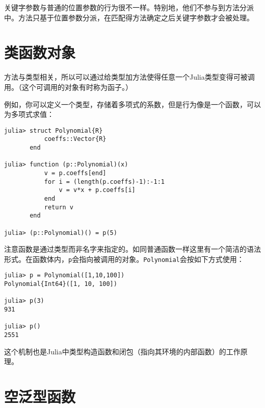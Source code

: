 关键字参数与普通的位置参数的行为很不一样。特别地，他们不参与到方法分派中。方法只基于位置参数分派，在匹配得方法确定之后关键字参数才会被处理。



\hypertarget{12721694880938168924}{}


\section{类函数对象}



方法与类型相关，所以可以通过给类型加方法使得任意一个Julia类型变得{\textquotedbl}可被调用{\textquotedbl}。（这个{\textquotedbl}可调用{\textquotedbl}的对象有时称为{\textquotedbl}函子{\textquotedbl}。）



例如，你可以定义一个类型，存储着多项式的系数，但是行为像是一个函数，可以为多项式求值：




\begin{verbatim}
julia> struct Polynomial{R}
           coeffs::Vector{R}
       end

julia> function (p::Polynomial)(x)
           v = p.coeffs[end]
           for i = (length(p.coeffs)-1):-1:1
               v = v*x + p.coeffs[i]
           end
           return v
       end

julia> (p::Polynomial)() = p(5)
\end{verbatim}



注意函数是通过类型而非名字来指定的。如同普通函数一样这里有一个简洁的语法形式。在函数体内，\texttt{p}会指向被调用的对象。\texttt{Polynomial}会按如下方式使用：




\begin{verbatim}
julia> p = Polynomial([1,10,100])
Polynomial{Int64}([1, 10, 100])

julia> p(3)
931

julia> p()
2551
\end{verbatim}



这个机制也是Julia中类型构造函数和闭包（指向其环境的内部函数）的工作原理。



\hypertarget{117540638029415517}{}


\section{空泛型函数}



